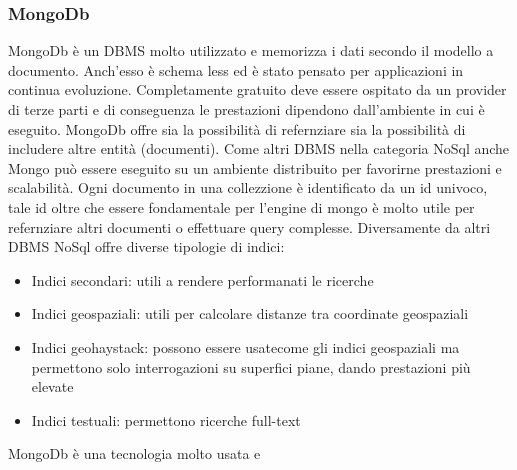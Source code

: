 \subsubsection*{MongoDb}
MongoDb è un DBMS molto utilizzato e memorizza i dati secondo il modello a documento. Anch'esso è schema less ed è stato pensato per applicazioni in continua evoluzione. Completamente gratuito deve essere ospitato da un provider di terze parti e di conseguenza le prestazioni dipendono dall'ambiente in cui è eseguito. MongoDb offre sia la possibilità di refernziare sia la possibilità di includere altre entità (documenti). Come altri DBMS nella categoria NoSql anche Mongo può essere eseguito su un ambiente distribuito per favorirne prestazioni e scalabilità. Ogni documento in una collezzione è identificato da un id univoco, tale id oltre che essere fondamentale per l'engine di mongo è molto utile per refernziare altri documenti o effettuare query complesse.
Diversamente da altri DBMS NoSql offre diverse tipologie di indici:
\begin{itemize}
	\item Indici secondari: utili a rendere performanati le ricerche
	\item Indici geospaziali: utili per calcolare distanze tra coordinate geospaziali
	\item Indici geohaystack: possono essere usatecome gli indici geospaziali ma permettono solo interrogazioni su superfici piane, dando prestazioni più elevate
	\item Indici testuali: permettono ricerche full-text
\end{itemize} 
MongoDb è una tecnologia molto usata e 

